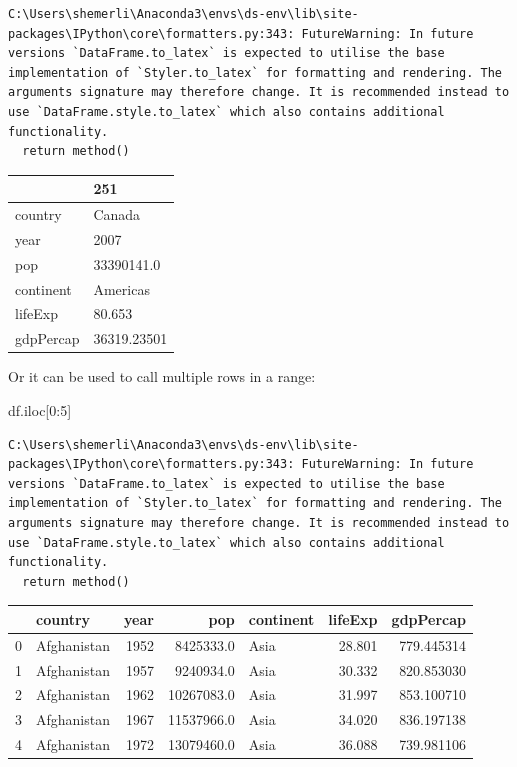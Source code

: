 \documentclass[
  letterpaper,
  DIV=11,
  numbers=noendperiod]{scrreprt}
\newenvironment{Shaded}{\begin{snugshade}}{\end{snugshade}}
\newcommand{\DecValTok}[1]{\textcolor[rgb]{0.68,0.00,0.00}{#1}}
\newcommand{\NormalTok}[1]{\textcolor[rgb]{0.00,0.23,0.31}{#1}}
\begin{document}
\begin{verbatim}
C:\Users\shemerli\Anaconda3\envs\ds-env\lib\site-packages\IPython\core\formatters.py:343: FutureWarning: In future versions `DataFrame.to_latex` is expected to utilise the base implementation of `Styler.to_latex` for formatting and rendering. The arguments signature may therefore change. It is recommended instead to use `DataFrame.style.to_latex` which also contains additional functionality.
  return method()
\end{verbatim}

\begin{tabular}{ll}
\toprule
{} &          251 \\
\midrule
country   &       Canada \\
year      &         2007 \\
pop       &   33390141.0 \\
continent &     Americas \\
lifeExp   &       80.653 \\
gdpPercap &  36319.23501 \\
\bottomrule
\end{tabular}

Or it can be used to call multiple rows in a range:

\begin{Shaded}
\begin{Highlighting}[]
\NormalTok{df.iloc[}\DecValTok{0}\NormalTok{:}\DecValTok{5}\NormalTok{]}
\end{Highlighting}
\end{Shaded}

\begin{verbatim}
C:\Users\shemerli\Anaconda3\envs\ds-env\lib\site-packages\IPython\core\formatters.py:343: FutureWarning: In future versions `DataFrame.to_latex` is expected to utilise the base implementation of `Styler.to_latex` for formatting and rendering. The arguments signature may therefore change. It is recommended instead to use `DataFrame.style.to_latex` which also contains additional functionality.
  return method()
\end{verbatim}

\begin{tabular}{llrrlrr}
\toprule
{} &      country &  year &         pop & continent &  lifeExp &   gdpPercap \\
\midrule
0 &  Afghanistan &  1952 &   8425333.0 &      Asia &   28.801 &  779.445314 \\
1 &  Afghanistan &  1957 &   9240934.0 &      Asia &   30.332 &  820.853030 \\
2 &  Afghanistan &  1962 &  10267083.0 &      Asia &   31.997 &  853.100710 \\
3 &  Afghanistan &  1967 &  11537966.0 &      Asia &   34.020 &  836.197138 \\
4 &  Afghanistan &  1972 &  13079460.0 &      Asia &   36.088 &  739.981106 \\
\bottomrule
\end{tabular}
\end{document}
